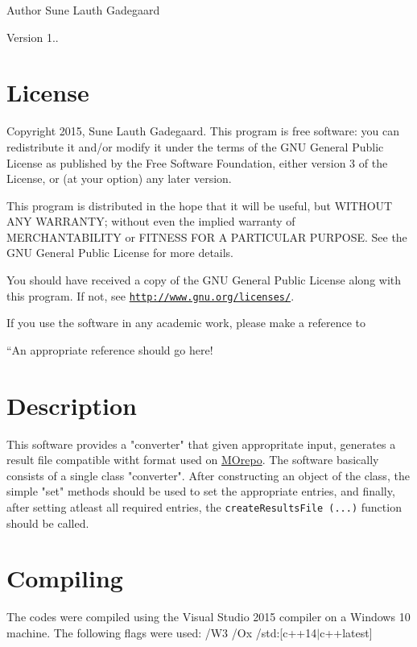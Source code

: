 \begin{DoxyAuthor}{Author}
Sune Lauth Gadegaard 
\end{DoxyAuthor}
\begin{DoxyVersion}{Version}
1..
\end{DoxyVersion}
\hypertarget{index_License}{}\section{License}\label{index_License}
Copyright 2015, Sune Lauth Gadegaard. This program is free software\+: you can redistribute it and/or modify it under the terms of the G\+NU General Public License as published by the Free Software Foundation, either version 3 of the License, or (at your option) any later version.

This program is distributed in the hope that it will be useful, but W\+I\+T\+H\+O\+UT A\+NY W\+A\+R\+R\+A\+N\+TY; without even the implied warranty of M\+E\+R\+C\+H\+A\+N\+T\+A\+B\+I\+L\+I\+TY or F\+I\+T\+N\+E\+SS F\+OR A P\+A\+R\+T\+I\+C\+U\+L\+AR P\+U\+R\+P\+O\+SE. See the G\+NU General Public License for more details.

You should have received a copy of the G\+NU General Public License along with this program. If not, see \href{http://www.gnu.org/licenses/}{\tt http\+://www.\+gnu.\+org/licenses/}.

If you use the software in any academic work, please make a reference to

``\+An appropriate reference should go here!\textquotesingle{}\textquotesingle{}  
\section{Description}

This software provides a "converter" that given appropritate input, generates a result file compatible witht format used on \href{https://github.com/MCDMSociety}{MOrepo}.
The software basically consists of a single class "converter". After constructing an object of the class, the simple "set" methods should be used to set the appropriate
entries, and finally, after setting atleast all required entries, the \texttt{createResultsFile (...)} function should be called.
\hypertarget{index_Compiling}{}\section{Compiling}\label{index_Compiling}
The codes were compiled using the Visual Studio 2015 compiler on a Windows 10 machine. The following flags were used\+: /\+W3 /\+Ox /std\+:\mbox{[}c++14$\vert$c++latest\mbox{]}

